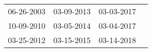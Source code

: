 \begin{supertabular}{llll}
 06-26-2003 &  03-09-2013 &  03-03-2017 \\
 10-09-2010 &  03-05-2014 &  03-04-2017 \\
 03-25-2012 &  03-15-2015 &  03-14-2018 \\
\end{supertabular}

